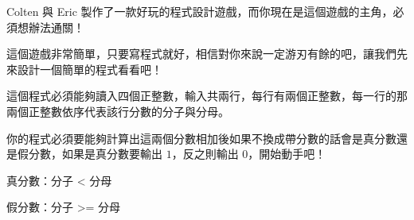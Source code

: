 Colten 與 Eric 製作了一款好玩的程式設計遊戲，而你現在是這個遊戲的主角，必須想辦法通關！

這個遊戲非常簡單，只要寫程式就好，相信對你來說一定游刃有餘的吧，讓我們先來設計一個簡單的程式看看吧！

這個程式必須能夠讀入四個正整數，輸入共兩行，每行有兩個正整數，每一行的那兩個正整數依序代表該行分數的分子與分母。

你的程式必須要能夠計算出這兩個分數相加後如果不換成帶分數的話會是真分數還是假分數，如果是真分數要輸出 $1$，反之則輸出 $0$，開始動手吧！

真分數：分子 < 分母

假分數：分子 >= 分母

